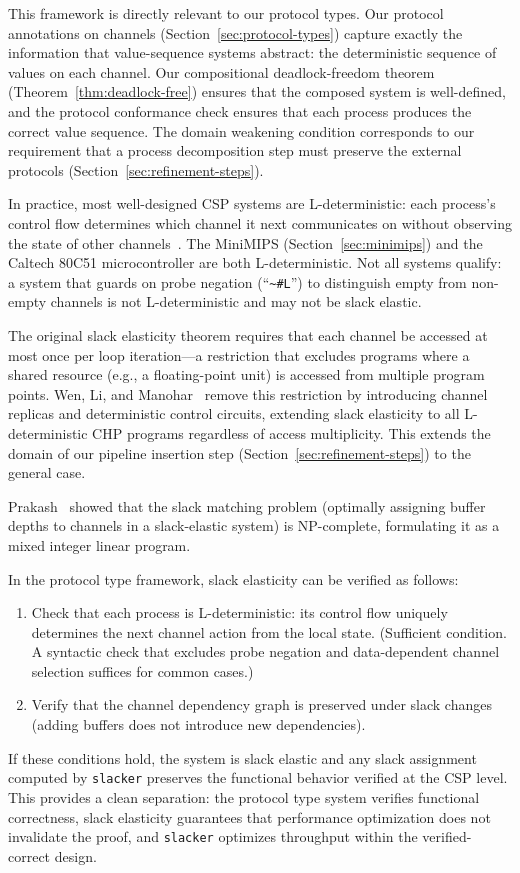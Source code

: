 \documentclass[11pt]{article}
\begin{document}
This framework is directly relevant to our protocol types.  Our
protocol annotations on channels (Section~\ref{sec:protocol-types})
capture exactly the information that value-sequence systems abstract:
the deterministic sequence of values on each channel.  Our
compositional deadlock-freedom theorem
(Theorem~\ref{thm:deadlock-free}) ensures that the composed system
is well-defined, and the protocol conformance check ensures that
each process produces the correct value sequence.  The domain
weakening condition corresponds to our requirement that a
process decomposition step must preserve the external protocols
(Section~\ref{sec:refinement-steps}).

In practice, most well-designed CSP systems are L-deterministic:
each process's control flow determines which channel it next
communicates on without observing the state of other
channels~\cite{papadantonakis2002}.
The MiniMIPS (Section~\ref{sec:minimips}) and the Caltech 80C51
microcontroller are both L-deterministic.
Not all systems qualify: a system that guards on probe negation
(``\texttt{\~{}\#L}'') to distinguish empty from non-empty channels
is not L-deterministic and may not be slack elastic.

The original slack elasticity theorem requires that each channel be
accessed at most once per loop iteration---a restriction that excludes
programs where a shared resource (e.g., a floating-point unit) is
accessed from multiple program points.  Wen, Li, and
Manohar~\cite{wen2025} remove this restriction by introducing channel
replicas and deterministic control circuits, extending slack
elasticity to all L-deterministic CHP programs regardless of access
multiplicity.  This extends the domain of our pipeline insertion step
(Section~\ref{sec:refinement-steps}) to the general case.

Prakash~\cite{prakash2008} showed that the slack
matching problem (optimally assigning buffer depths to channels in a
slack-elastic system) is NP-complete, formulating it as a mixed
integer linear program.

In the protocol type framework, slack elasticity can be verified as
follows:
\begin{enumerate}
\item Check that each process is L-deterministic: its control flow
  uniquely determines the next channel action from the local state.
  (Sufficient condition.  A syntactic check that excludes probe
  negation and data-dependent channel selection suffices for common
  cases.)
\item Verify that the channel dependency graph is preserved under
  slack changes (adding buffers does not introduce new dependencies).
\end{enumerate}
If these conditions hold, the system is slack elastic and any slack
assignment computed by \texttt{slacker} preserves the functional
behavior verified at the CSP level.  This provides a clean separation:
the protocol type system verifies functional correctness, slack
elasticity guarantees that performance optimization does not
invalidate the proof, and \texttt{slacker} optimizes throughput within
the verified-correct design.
\end{document}
